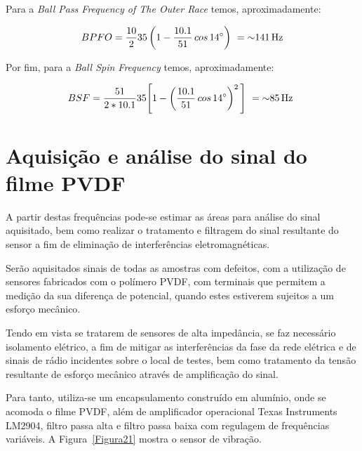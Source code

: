 \documentclass[
	12pt,				
	oneside,			
	a4paper,			
	english,			
	brazil,			
	]{abntex2ppgsi}
\begin{document}

Para a \textit{Ball Pass Frequency of The Outer Race} temos, aproximadamente:

\begin{equation}
	BPFO = \frac{10}{2}35 \left ( 1 - \frac{10.1}{51} \,cos \, \ang{14} \right )  \ = \SI{~141}{{\hertz}}
	\label{eq: BPFO no Rolamento}
\end{equation}


Por fim, para a \textit{Ball Spin Frequency} temos, aproximadamente:

\begin{equation}
	BSF = \frac{51}{2*10.1}35 \Bigg[  1 - \left ( \frac{10.1}{51} \,cos \, \ang{14} \right ) ^{2}  \Bigg] \ = \SI{~85}{{\hertz}} \
	\label{eq: BSF no rolamento}
\end{equation}


\section{\textbf{Aquisição e análise do sinal do filme PVDF}}

A partir destas frequências pode-se estimar as áreas para análise do sinal aquisitado, bem como realizar o tratamento e filtragem do sinal resultante do sensor a fim de eliminação de interferências eletromagnéticas. 

Serão aquisitados sinais de todas as amostras com defeitos, com a utilização de sensores fabricados com o polímero PVDF, com terminais que permitem a medição da sua diferença de potencial, quando estes estiverem sujeitos a um esforço mecânico. 

Tendo em vista se tratarem de sensores de alta impedância, se faz necessário isolamento elétrico, a fim de mitigar as interferências da fase da rede elétrica e de sinais de rádio incidentes sobre o local de testes, bem como tratamento da tensão resultante de esforço mecânico através de amplificação do sinal. 

Para tanto, utiliza-se um encapsulamento construído em alumínio, onde se acomoda o filme PVDF, além de amplificador operacional Texas Instruments LM2904, filtro passa alta e filtro passa baixa com regulagem de frequências variáveis. A Figura~\ref{Figura21} mostra o sensor de vibração. 
\end{document}

